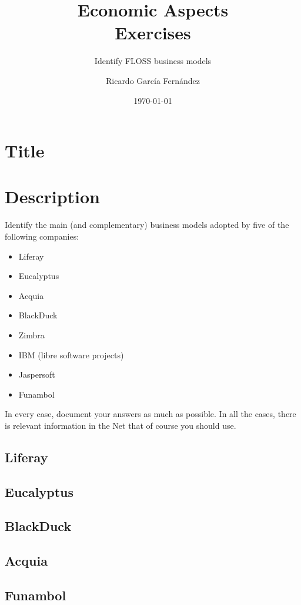 \documentclass[11pt]{scrartcl}
\title{\textbf{Economic Aspects\\
                Exercises}}
\subtitle{Identify FLOSS business models}
\author{Ricardo Garc\'ia Fern\'andez}
\date{\today}
\begin{document}
\maketitle

\section{Title}

\section{Description}

Identify the main (and complementary) business models adopted by five of the following companies:

\begin{itemize}
  \item Liferay
  \item Eucalyptus
  \item Acquia
  \item BlackDuck
  \item Zimbra
  \item IBM (libre software projects)
  \item Jaspersoft
  \item Funambol
\end{itemize}

In every case, document your answers as much as possible. In all the cases, there is relevant information in the Net that of course you should use.

\subsection{Liferay}

\subsection{Eucalyptus}

\subsection{BlackDuck}

\subsection{Acquia}

\subsection{Funambol}
\end{document}
